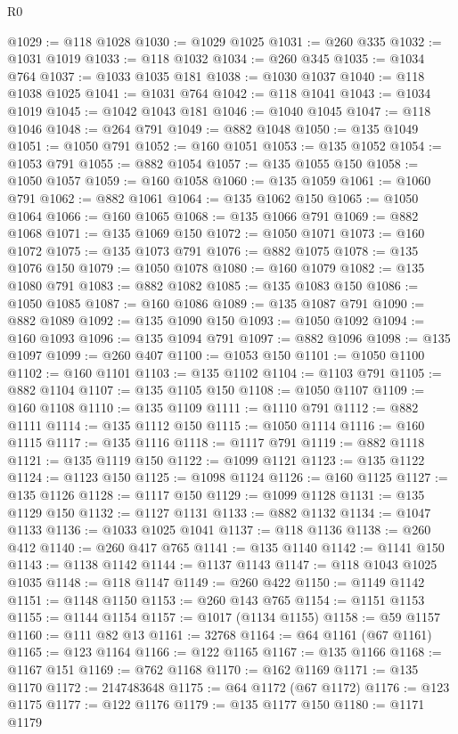\begin{lexlean}{R0}
\begin{coremodule}
@1029 := @118 @1028
@1030 := @1029 @1025
@1031 := @260 @335
@1032 := @1031 @1019
@1033 := @118 @1032
@1034 := @260 @345
@1035 := @1034 @764
@1037 := @1033 @1035 @181
@1038 := @1030 @1037
@1040 := @118 @1038 @1025
@1041 := @1031 @764
@1042 := @118 @1041
@1043 := @1034 @1019
@1045 := @1042 @1043 @181
@1046 := @1040 @1045
@1047 := @118 @1046
@1048 := @264 @791
@1049 := @882 @1048
@1050 := @135 @1049
@1051 := @1050 @791
@1052 := @160 @1051
@1053 := @135 @1052
@1054 := @1053 @791
@1055 := @882 @1054
@1057 := @135 @1055 @150
@1058 := @1050 @1057
@1059 := @160 @1058
@1060 := @135 @1059
@1061 := @1060 @791
@1062 := @882 @1061
@1064 := @135 @1062 @150
@1065 := @1050 @1064
@1066 := @160 @1065
@1068 := @135 @1066 @791
@1069 := @882 @1068
@1071 := @135 @1069 @150
@1072 := @1050 @1071
@1073 := @160 @1072
@1075 := @135 @1073 @791
@1076 := @882 @1075
@1078 := @135 @1076 @150
@1079 := @1050 @1078
@1080 := @160 @1079
@1082 := @135 @1080 @791
@1083 := @882 @1082
@1085 := @135 @1083 @150
@1086 := @1050 @1085
@1087 := @160 @1086
@1089 := @135 @1087 @791
@1090 := @882 @1089
@1092 := @135 @1090 @150
@1093 := @1050 @1092
@1094 := @160 @1093
@1096 := @135 @1094 @791
@1097 := @882 @1096
@1098 := @135 @1097
@1099 := @260 @407
@1100 := @1053 @150
@1101 := @1050 @1100
@1102 := @160 @1101
@1103 := @135 @1102
@1104 := @1103 @791
@1105 := @882 @1104
@1107 := @135 @1105 @150
@1108 := @1050 @1107
@1109 := @160 @1108
@1110 := @135 @1109
@1111 := @1110 @791
@1112 := @882 @1111
@1114 := @135 @1112 @150
@1115 := @1050 @1114
@1116 := @160 @1115
@1117 := @135 @1116
@1118 := @1117 @791
@1119 := @882 @1118
@1121 := @135 @1119 @150
@1122 := @1099 @1121
@1123 := @135 @1122
@1124 := @1123 @150
@1125 := @1098 @1124
@1126 := @160 @1125
@1127 := @135 @1126
@1128 := @1117 @150
@1129 := @1099 @1128
@1131 := @135 @1129 @150
@1132 := @1127 @1131
@1133 := @882 @1132
@1134 := @1047 @1133
@1136 := @1033 @1025 @1041
@1137 := @118 @1136
@1138 := @260 @412
@1140 := @260 @417 @765
@1141 := @135 @1140
@1142 := @1141 @150
@1143 := @1138 @1142
@1144 := @1137 @1143
@1147 := @118 @1043 @1025 @1035
@1148 := @118 @1147
@1149 := @260 @422
@1150 := @1149 @1142
@1151 := @1148 @1150
@1153 := @260 @143 @765
@1154 := @1151 @1153
@1155 := @1144 @1154
@1157 := @1017 (@1134 @1155)
@1158 := @59 @1157
@1160 := @111 @82 @13
@1161 := 32768
@1164 := @64 @1161 (@67 @1161)
@1165 := @123 @1164
@1166 := @122 @1165
@1167 := @135 @1166
@1168 := @1167 @151
@1169 := @762 @1168
@1170 := @162 @1169
@1171 := @135 @1170
@1172 := 2147483648
@1175 := @64 @1172 (@67 @1172)
@1176 := @123 @1175
@1177 := @122 @1176
@1179 := @135 @1177 @150
@1180 := @1171 @1179

\end{coremodule}
\end{lexlean}
